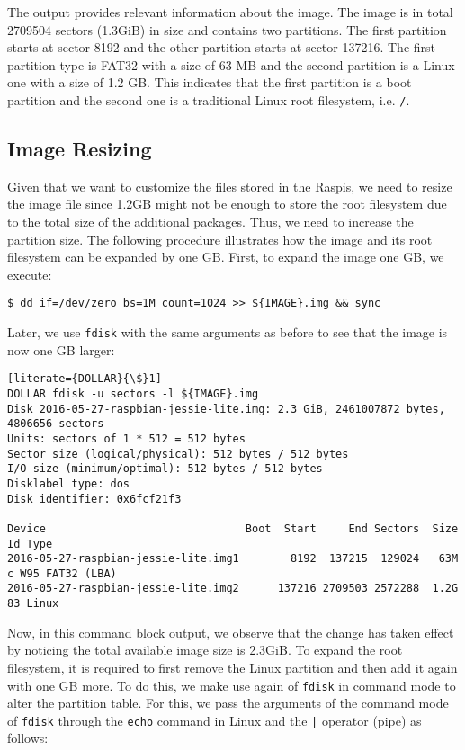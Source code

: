 The output provides relevant information about the image. The image is in
total 2709504 sectors (1.3GiB) in size and contains two partitions. The
first partition starts at sector 8192 and the other partition starts at
sector 137216. The first partition type is FAT32 with a size of 63 MB
and the second partition is a Linux one with a size of 1.2 GB. This
indicates that the first partition is a boot partition and the second
one is a traditional Linux root filesystem, i.e. \texttt{/}.

\subsection{Image Resizing}
Given that we want to customize the files stored in the \ac{Raspi}s,
we need to resize the image file since 1.2GB might not be enough to store
the root filesystem due to the total size of the additional packages. Thus,
we need to increase the partition size. The following procedure illustrates
how the image and its root filesystem can be expanded by one \ac{GB}.
First, to expand the image one \ac{GB}, we execute:

\begin{lstlisting}[]
$ dd if=/dev/zero bs=1M count=1024 >> ${IMAGE}.img && sync
\end{lstlisting}
\FloatBarrier
\vspace{-5mm}

Later, we use \texttt{fdisk} with the same arguments as before to see that
the image is now one \ac{GB} larger:
\begin{lstlisting}[literate={DOLLAR}{\$}1]
DOLLAR fdisk -u sectors -l ${IMAGE}.img
Disk 2016-05-27-raspbian-jessie-lite.img: 2.3 GiB, 2461007872 bytes, 4806656 sectors
Units: sectors of 1 * 512 = 512 bytes
Sector size (logical/physical): 512 bytes / 512 bytes
I/O size (minimum/optimal): 512 bytes / 512 bytes
Disklabel type: dos
Disk identifier: 0x6fcf21f3

Device                               Boot  Start     End Sectors  Size Id Type
2016-05-27-raspbian-jessie-lite.img1        8192  137215  129024   63M  c W95 FAT32 (LBA)
2016-05-27-raspbian-jessie-lite.img2      137216 2709503 2572288  1.2G 83 Linux
\end{lstlisting}
\FloatBarrier
\vspace{-5mm}

Now, in this command block output, we observe that the change has taken
effect by noticing the total available image size is 2.3GiB. To expand the
root filesystem, it is required to first remove the Linux partition
and then add it again with one \ac{GB} more. To do this, we make use
again of \texttt{fdisk} in command mode to alter the partition table.
For this, we pass the arguments of the command mode of \texttt{fdisk}
through the \texttt{echo} command in Linux and the \texttt{|} operator
(pipe) as follows:

